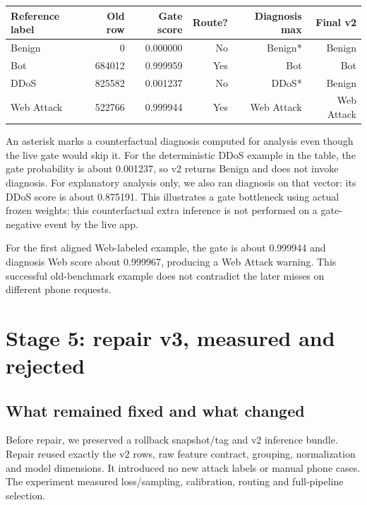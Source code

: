 \documentclass[11pt,a4paper,oneside]{report}
\begin{document}
{\small
\begin{longtable}{@{}lrrrrr@{}}
\toprule
Reference label & Old row & Gate score & Route? & Diagnosis max & Final v2\\\midrule\endhead
Benign & 0 & 0.000000 & No & Benign* & Benign\\
Bot & 684012 & 0.999959 & Yes & Bot & Bot\\
DDoS & 825582 & 0.001237 & No & DDoS* & Benign\\
Web Attack & 522766 & 0.999944 & Yes & Web Attack & Web Attack\\
\bottomrule\end{longtable}
}
An asterisk marks a counterfactual diagnosis computed for analysis even though the live gate would skip it.
For the deterministic DDoS example in the table, the gate probability is about 0.001237, so v2 returns Benign and does not invoke diagnosis. For explanatory analysis only, we also ran diagnosis on that vector: its DDoS score is about 0.875191. This illustrates a gate bottleneck using actual frozen weights; this counterfactual extra inference is not performed on a gate-negative event by the live app.

For the first aligned Web-labeled example, the gate is about 0.999944 and diagnosis Web score about 0.999967, producing a Web Attack warning. This successful old-benchmark example does not contradict the later misses on different phone requests.

\chapter{Stage 5: repair v3, measured and rejected}
\section{What remained fixed and what changed}
Before repair, we preserved a rollback snapshot/tag and v2 inference bundle. Repair reused exactly the v2 rows, raw feature contract, grouping, normalization and model dimensions. It introduced no new attack labels or manual phone cases. The experiment measured loss/sampling, calibration, routing and full-pipeline selection.
\end{document}
